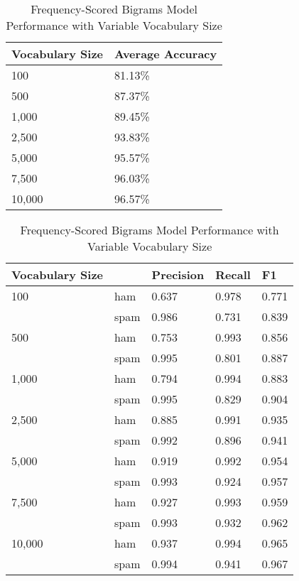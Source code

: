 \documentclass[a4paper]{article}
\begin{document}
	\begin{table}[H]
		\centering
		\caption{Frequency-Scored Bigrams Model Performance with Variable Vocabulary Size}
		\begin{tabular}{ll}
			Vocabulary Size & Average Accuracy \\
			\hline
			100 & 81.13\% \\
			500 & 87.37\% \\
			1,000 & 89.45\% \\
			2,500 & 93.83\% \\
			5,000 & 95.57\% \\
			7,500 & 96.03\% \\
			10,000 & 96.57\%
		\end{tabular}
		\begin{tabular}{l|llll}
			Vocabulary Size & & Precision & Recall & F1 \\
			\hline
			100 & ham  & 0.637 & 0.978 & 0.771 \\
				& spam & 0.986 & 0.731 & 0.839 \\
			\hline
			500 & ham  & 0.753 & 0.993 & 0.856 \\
				& spam & 0.995 & 0.801 & 0.887 \\
			\hline
			1,000 & ham  & 0.794 & 0.994 & 0.883 \\
				  &	spam & 0.995 & 0.829 & 0.904 \\
		    \hline
		    2,500 & ham  & 0.885 & 0.991 & 0.935 \\
		    	  & spam & 0.992 & 0.896 & 0.941 \\
		   	\hline
		   	5,000 & ham  & 0.919 & 0.992 & 0.954 \\
		   		  & spam & 0.993 & 0.924 & 0.957 \\
		   	\hline
		   	7,500 & ham  & 0.927 & 0.993 & 0.959 \\
		   	      & spam & 0.993 & 0.932 & 0.962 \\
 	        \hline
 	        10,000 & ham  & 0.937 & 0.994 & 0.965 \\
 	        	   & spam & 0.994 & 0.941 & 0.967
		\end{tabular}
	\end{table}
\end{document}
